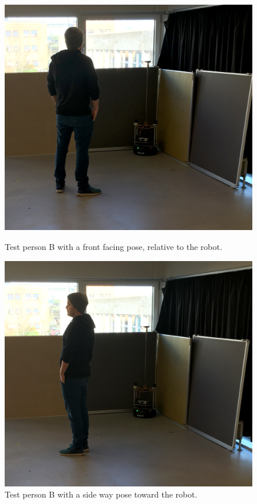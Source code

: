 \begin{figure}[H]
    \centering
    \begin{minipage}[b]{0.48\linewidth}
    \centering
    \includegraphics[width=\textwidth]{figures/test_front.png}
    \caption{Test person B with a front facing pose, relative to the robot.}
    \label{fig:testfront}
    \end{minipage}
    \hspace{0.2cm}
    \begin{minipage}[b]{0.48\linewidth}
    \centering
    \includegraphics[width=\textwidth]{figures/test_side.png}
    \caption{Test person B with a side way pose toward the robot.}
    \label{fig:testside}
    \end{minipage}
\end{figure}

